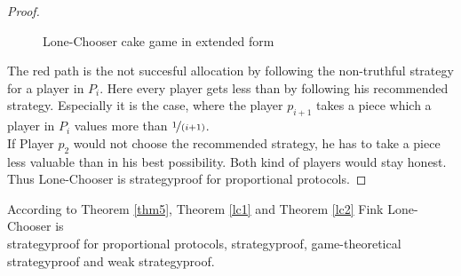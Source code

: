\begin{proof}
\begin{figure}[h!]
\begin{center}
	\caption{Lone-Chooser cake game in extended form}
\end{center}
\end{figure}
\newline
The red path is the not succesful allocation by following the non-truthful strategy for a player in $P_i$. Here every player gets less than by following his recommended strategy. Especially it is the case, where the player $p_{i+1}$ takes a piece which a player in $P_i$ values more than $\nicefrac{1}{(i+1)}$.\\If Player $p_2$ would not choose the recommended strategy, he has to take a piece less valuable than in his best possibility. Both kind of players would stay honest. Thus Lone-Chooser is strategyproof for proportional protocols.
\end{proof}
\begin{bezeichnungen}
According to Theorem \ref{thm5}, Theorem \ref{lc1} and Theorem \ref{lc2} Fink Lone-Chooser is\\strategyproof for proportional protocols, strategyproof, game-theoretical strategyproof and weak strategyproof.
\end{bezeichnungen}
\newpage
